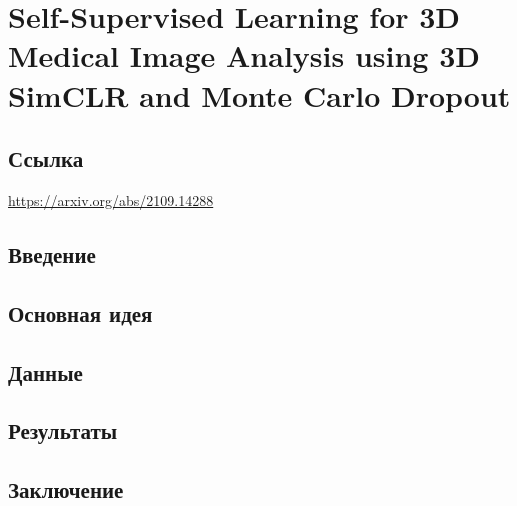 \section{Self-Supervised Learning for 3D Medical Image Analysis using
3D SimCLR and Monte Carlo Dropout}

\subsection*{Ссылка} \url{https://arxiv.org/abs/2109.14288}
\subsection*{Введение} 


\subsection*{Основная идея}


\subsection*{Данные}
\subsection*{Результаты}
\subsection*{Заключение}